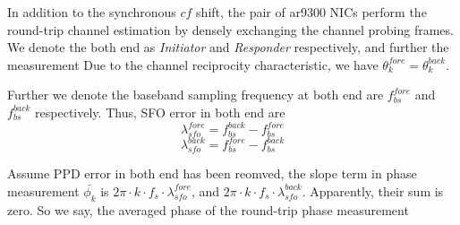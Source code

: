 In addition to the synchronous $cf$ shift, 
the pair of ar9300 NICs perform the round-trip channel estimation 
by densely exchanging the channel probing frames.
We denote the both end as \textit{Initiator} and \textit{Responder} respectively,
and further the measurement 
Due to the channel reciprocity characteristic, 
we have $\theta_k^{fore} = \theta_k^{back}$.


Further we denote the baseband sampling frequency at both end
are $f_{bs}^{fore}$ and $f_{bs}^{back}$ respectively.
Thus, SFO error in both end are
\begin{equation}
	\lambda_{sfo}^{fore} = f_{bs}^{back} - f_{bs}^{fore} 
\end{equation}
\begin{equation}
	\lambda_{sfo}^{back} = f_{bs}^{fore} - f_{bs}^{back} 
\end{equation}

Assume PPD error in both end has been reomved, the slope term in phase measurement $\bar{\phi_k}$ is $2\pi\cdot k\cdot f_s\cdot\lambda_{sfo}^{fore}$, and $2\pi\cdot k\cdot f_s\cdot\lambda_{sfo}^{back}$. Apparently, their sum is zero. So we say, the averaged phase of the round-trip phase measurement 







